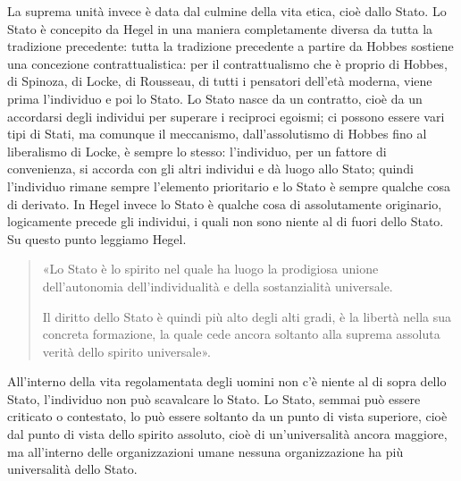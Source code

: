 \documentclass[a4paper,12pt,oneside,openany]{book}%
\begin{document}
La suprema unità invece è data dal culmine della vita etica, cioè dallo Stato. Lo Stato è concepito da Hegel in una maniera completamente diversa da tutta la tradizione precedente: tutta la tradizione precedente a partire da Hobbes sostiene una concezione contrattualistica: per il contrattualismo che è proprio di Hobbes, di Spinoza, di Locke, di Rousseau, di tutti i pensatori dell’età moderna, viene prima l’individuo e poi lo Stato. Lo Stato nasce da un contratto, cioè da un accordarsi degli individui per superare i reciproci egoismi; ci possono essere vari tipi di Stati, ma comunque il meccanismo, dall’assolutismo di Hobbes fino al liberalismo di Locke, è sempre lo stesso: l’individuo, per un fattore di convenienza, si accorda con gli altri individui e dà luogo allo Stato; quindi l’individuo rimane sempre l’elemento prioritario e lo Stato è sempre qualche cosa di derivato. In Hegel invece lo Stato è qualche cosa di assolutamente originario, logicamente precede gli individui, i quali non sono niente al di fuori dello Stato. Su questo punto leggiamo Hegel.

\begin{quotation}
	«Lo Stato è lo spirito nel quale ha luogo la prodigiosa unione dell’autonomia dell’individualità e della sostanzialità universale.

Il diritto dello Stato è quindi più alto degli alti gradi, è la libertà nella sua concreta formazione, la quale cede ancora soltanto alla suprema assoluta verità dello spirito universale».

\end{quotation}

All’interno della vita regolamentata degli uomini non c’è niente al di sopra dello Stato, l’individuo non può scavalcare lo Stato. Lo Stato, semmai può essere criticato o contestato, lo può essere soltanto da un punto di vista superiore, cioè dal punto di vista dello spirito assoluto, cioè di un’universalità ancora maggiore, ma all’interno delle organizzazioni umane nessuna organizzazione ha più universalità dello Stato. 	
\end{document}
